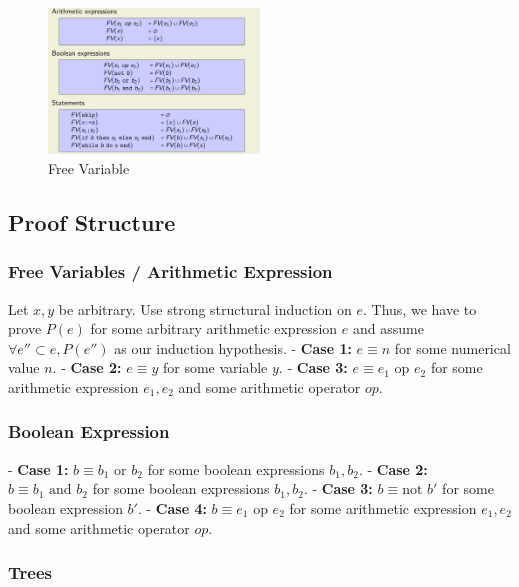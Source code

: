 \documentclass{article}
\begin{document}
\begin{figure}[ht]
    \centering
    \includegraphics[width=0.5\textwidth]{assets/free-variable.png}
    \caption{Free Variable}
\end{figure}

\subsection{Proof Structure}

\subsubsection{Free Variables / Arithmetic Expression}

Let $x, y$ be arbitrary. Use strong structural induction on $e$. Thus, we have to prove $P(e)$ for some arbitrary arithmetic expression $e$ and assume $\forall e'' \subset e, P(e'')$ as our induction hypothesis.
- \textbf{Case 1:} $e \equiv n$ for some numerical value $n$.
- \textbf{Case 2:} $e \equiv y$ for some variable $y$.
- \textbf{Case 3:} $e \equiv e_1 \text{ op } e_2$ for some arithmetic expression $e_1, e_2$ and some arithmetic operator $op$.

\subsubsection{Boolean Expression}

- \textbf{Case 1:} $b \equiv b_1 \text{ or } b_2$ for some boolean expressions $b_1, b_2$.
- \textbf{Case 2:} $b \equiv b_1 \text{ and } b_2$ for some boolean expressions $b_1, b_2$.
- \textbf{Case 3:} $b \equiv \text{not } b'$ for some boolean expression $b'$.
- \textbf{Case 4:} $b \equiv e_1 \text{ op } e_2$ for some arithmetic expression $e_1, e_2$ and some arithmetic operator $op$.

\subsubsection{Trees}
\end{document}
